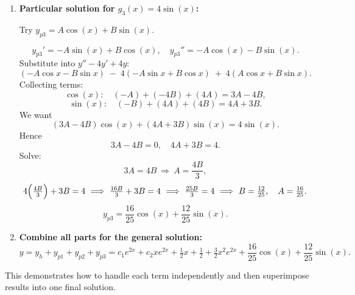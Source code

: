 \begin{example}
\begin{solution}
\begin{enumerate}
\item \textbf{Particular solution for $g_3(x) = 4\sin(x)$:}

   Try \(y_{p3} = A\cos(x) + B\sin(x).\)

   \[
   y_{p3}' = -A\sin(x) + B\cos(x), \quad
   y_{p3}'' = -A\cos(x) - B\sin(x).
   \]
   Substitute into \(y'' - 4y' + 4y\):
   \[
   (-A\cos x - B\sin x)
   \;-\;4(-A\sin x + B\cos x)
   \;+\;4(A\cos x + B\sin x).
   \]
   Collecting terms:
   \[
   \cos(x):\quad (-A) + (-4B) + (4A) = 3A - 4B,
   \]
   \[
   \sin(x):\quad (-B) + (4A) + (4B) = 4A + 3B.
   \]
   We want
   \[
   (3A - 4B)\cos(x) + (4A + 3B)\sin(x) = 4\sin(x).
   \]
   Hence
   \[
   3A - 4B = 0, 
   \quad
   4A + 3B = 4.
   \]
   Solve:
   \[
   3A = 4B \ \Longrightarrow\ A = \frac{4B}{3},
   \]
   \[
   4\Bigl(\tfrac{4B}{3}\Bigr) + 3B = 4 \ \Longrightarrow\ \tfrac{16B}{3} + 3B = 4 
   \ \Longrightarrow\ \tfrac{25B}{3} = 4 
   \ \Longrightarrow\ B = \tfrac{12}{25}, \quad A = \tfrac{16}{25}.
   \]
   \[
   y_{p3} = \frac{16}{25}\cos(x) + \frac{12}{25}\sin(x).
   \]

\item \textbf{Combine all parts for the general solution:}
   \[
   y = y_h + y_{p1} + y_{p2} + y_{p3}
     = c_1 e^{2x}
       + c_2 x e^{2x}
       + \tfrac{1}{2}x 
       + \tfrac{1}{2}
       + \tfrac{3}{2} x^2 e^{2x}
       + \frac{16}{25}\cos(x)
       + \frac{12}{25}\sin(x).
   \]
\end{enumerate}

\noindent This demonstrates how to handle each term independently and then superimpose results into one final solution.
\end{solution}
\end{example}
\exampleline
